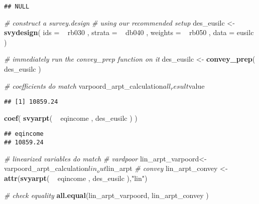 \documentclass[]{book}
\newenvironment{Shaded}{\begin{snugshade}}{\end{snugshade}}
\newcommand{\KeywordTok}[1]{\textcolor[rgb]{0.13,0.29,0.53}{\textbf{{#1}}}}
\newcommand{\DataTypeTok}[1]{\textcolor[rgb]{0.13,0.29,0.53}{{#1}}}
\newcommand{\StringTok}[1]{\textcolor[rgb]{0.31,0.60,0.02}{{#1}}}
\newcommand{\CommentTok}[1]{\textcolor[rgb]{0.56,0.35,0.01}{\textit{{#1}}}}
\newcommand{\NormalTok}[1]{{#1}}
\theoremstyle{definition}
\theoremstyle{definition}
\theoremstyle{remark}
\begin{document}
\begin{verbatim}
## NULL
\end{verbatim}

\begin{Shaded}
\begin{Highlighting}[]
\CommentTok{# construct a survey.design}
\CommentTok{# using our recommended setup}
\NormalTok{des_eusilc <-}\StringTok{ }
\StringTok{    }\KeywordTok{svydesign}\NormalTok{( }
        \DataTypeTok{ids =} \NormalTok{~}\StringTok{ }\NormalTok{rb030 , }
        \DataTypeTok{strata =} \NormalTok{~}\StringTok{ }\NormalTok{db040 ,  }
        \DataTypeTok{weights =} \NormalTok{~}\StringTok{ }\NormalTok{rb050 , }
        \DataTypeTok{data =} \NormalTok{eusilc}
    \NormalTok{)}

\CommentTok{# immediately run the convey_prep function on it}
\NormalTok{des_eusilc <-}\StringTok{ }\KeywordTok{convey_prep}\NormalTok{( des_eusilc )}

\CommentTok{# coefficients do match}
\NormalTok{varpoord_arpt_calculation$all_result$value}
\end{Highlighting}
\end{Shaded}

\begin{verbatim}
## [1] 10859.24
\end{verbatim}

\begin{Shaded}
\begin{Highlighting}[]
\KeywordTok{coef}\NormalTok{( }\KeywordTok{svyarpt}\NormalTok{( ~}\StringTok{ }\NormalTok{eqincome , des_eusilc ) )}
\end{Highlighting}
\end{Shaded}

\begin{verbatim}
## eqincome 
## 10859.24
\end{verbatim}

\begin{Shaded}
\begin{Highlighting}[]
\CommentTok{# linearized variables do match}
\CommentTok{# vardpoor}
\NormalTok{lin_arpt_varpoord<-}\StringTok{ }\NormalTok{varpoord_arpt_calculation$lin_out$lin_arpt}
\CommentTok{# convey }
\NormalTok{lin_arpt_convey <-}\StringTok{ }\KeywordTok{attr}\NormalTok{(}\KeywordTok{svyarpt}\NormalTok{( ~}\StringTok{ }\NormalTok{eqincome , des_eusilc ),}\StringTok{"lin"}\NormalTok{)}

\CommentTok{# check equality}
\KeywordTok{all.equal}\NormalTok{(lin_arpt_varpoord, lin_arpt_convey )}
\end{Highlighting}
\end{Shaded}
\end{document}
